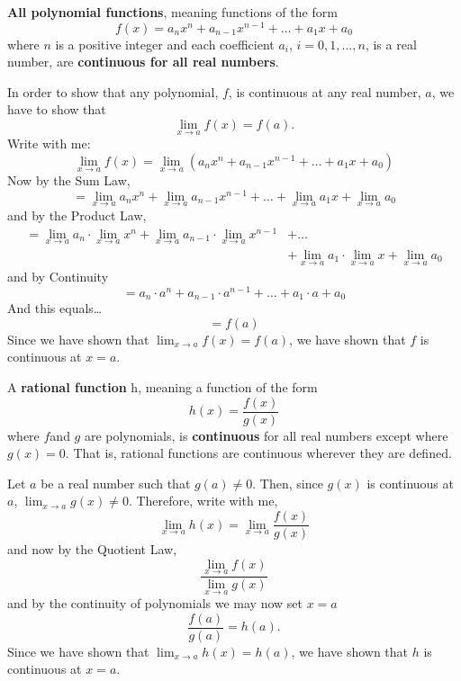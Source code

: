 \documentclass{ximera}
\begin{document}
\begin{theorem}
 \textbf{All polynomial functions}, meaning functions of the form
  \[
  f(x) = a_nx^n + a_{n-1}x^{n-1} + \dots + a_1 x + a_0
  \]
  where $n$ is a positive integer  and each coefficient $a_i$, $i=0, 1,...,n$, is a real number, are
  \textbf{continuous for all real numbers}.
  \begin{explanation}
  In order to show that any polynomial, $f$, is continuous at any real number, $a$, we have to show that
  \[
  \lim_{x\to a} f(x)=f(a).
  \]
  Write with me:
  \[
  \lim_{x\to a} f(x) = \lim_{x\to a} (a_nx^n + a_{n-1}x^{n-1} + \dots + a_1 x + a_0 )
  \]
  Now by the Sum Law,
  \[
  = \lim_{x\to a} a_nx^n + \lim_{x\to a} a_{n-1}x^{n-1} + \dots +  \lim_{x\to a}a_1 x + \lim_{x\to a} a_0
  \]
  and by the Product Law,
  \begin{align*}
    = \lim_{x\to a} a_n\cdot \lim_{x\to a}x^n + \lim_{x\to a} a_{n-1}\cdot \lim_{x\to a}x^{n-1} &+ \dots\\
    &+  \lim_{x\to a}a_1 \cdot \lim_{x\to a}x + \lim_{x\to a} a_0
  \end{align*}
  and by Continuity
  \[
  = a_n\cdot a^n +  a_{n-1}\cdot a^{n-1} + \dots + a_1 \cdot a + a_0
  \]
  And this equals\dots
  \[
  =f(a)
  \]
  Since we have shown that $\lim_{x\to a} f(x) = f(a)$, we have
  shown that $f$ is continuous at $x=a$.
\end{explanation}
\end{theorem}

\begin{theorem}
   A \textbf{rational function} h, meaning a function of the form 
  \[
  h(x)=\frac{f(x)}{g(x)}
  \]
  where $f $and $g$ are polynomials, is \textbf{continuous} for all real numbers except where $g(x)=0$.  That is,
  rational functions are continuous wherever they are defined.
\begin{explanation}
      Let $a$ be a real number such that $g(a)\neq 0$.  Then, since
      $g(x)$ is continuous at $a$, $\lim_{x\to a} g(x) \neq 0$.
      Therefore, write with me, 
      \[
      \lim_{x \to a} h(x) = \lim_{x\to a} \frac{f(x)}{g(x)}
      \]
      and now by the Quotient Law, 
      \[
      \frac{\lim_{x\to a} f(x)}{ \lim_{x\to a} g(x)}
      \]
      and by the continuity of polynomials we may now set $x=a$
      \[
      \frac{f(a)}{g(a)}=h(a).
      \]
      Since we have shown that $\lim_{x\to a} h(x) = h(a)$, we have
      shown that $h$ is continuous at $x=a$.
\end{explanation}
\end{theorem}
\end{document}
